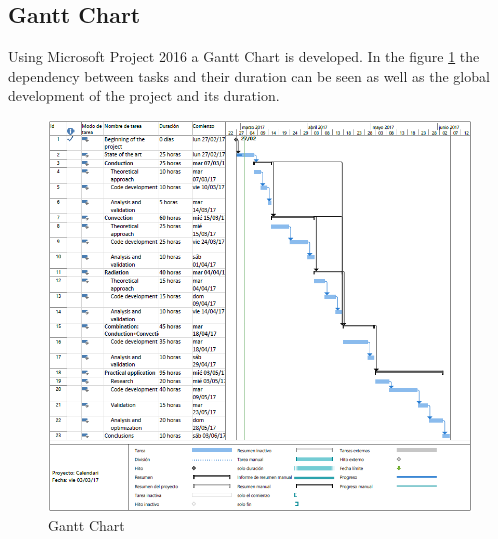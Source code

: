 \subsection{Gantt Chart}
Using Microsoft Project 2016 a Gantt Chart is developed. In the figure \ref{ganttchart} the dependency between tasks and their duration can be seen as well as the global development of the project and its duration. 
\begin{center}
\begin{figure}[h!]
\includegraphics[scale=0.7]{Gantt}
\caption{Gantt Chart}
\label{ganttchart}
\end{figure}
\end{center}
